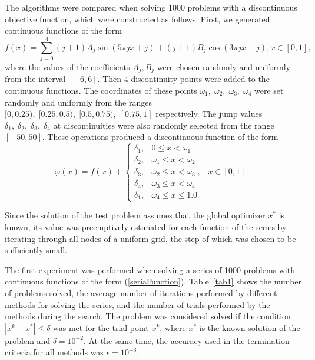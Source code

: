 \documentclass[runningheads]{llncs}
\begin{document}
The algorithms were compared when solving 1000 problems with a discontinuous objective function, which were constructed as follows. First, we generated continuous functions of the form
\begin{equation}\label{seriaFunction}
f(x) =  \sum_{j=0}^4{(j+1)A_j\sin{(5\pi jx+j)}+(j+1)B_j\cos(3\pi jx+j)}, x\in[0,1],
\end{equation}
where the values of the coefficients $A_j, B_j$ were chosen randomly and uniformly from the interval $[-6,6]$. Then 4 discontinuity points were added to the continuous functions. The coordinates of these points $\omega_1, \; \omega_2, \; \omega_3, \; \omega_4$ were set randomly and uniformly from the ranges $[0,0.25), \; [0.25,0.5), \; [0.5,0.75), \; [0.75,1]$ respectively. The jump values $\delta_1, \; \delta_2, \; \delta_3, \; \delta_4$ at discontinuities were also randomly selected from the range $[-50,50]$. These operations produced a discontinuous function of the form
\begin{equation}\label{seriaFunction_jump}
\varphi(x) =  f(x)+
\begin{cases}
	\delta_1, &0 \leq x < \omega_1\\
	\delta_2, &\omega_1 \leq x < \omega_2\\
	\delta_3, &\omega_2 \leq x < \omega_3 \;, \;\;\; x\in[0,1].\\
	\delta_4, &\omega_3 \leq x < \omega_4\\
	\delta_1, &\omega_4 \leq x \leq 1.0
\end{cases}
\end{equation}

Since the solution of the test problem assumes that the global optimizer $x^*$ is known, its value was preemptively estimated for each function of the series by iterating through all nodes of a uniform grid, the step of which was chosen to be sufficiently small.

The first experiment was performed when solving a series of 1000 problems with continuous functions of the form (\ref{seriaFunction}). Table~\ref{tab1} shows the number of problems solved, the average number of iterations performed by different methods for solving the series, and the number of trials performed by the methods during the search. The problem was considered solved if the condition $|x^k-x^* | \leq \delta$ was met for the trial point $x^k$, where $x^*$ is the known solution of the problem and $\delta= 10^{-2}$. At the same time, the accuracy used in the termination criteria for all methods was $\epsilon = 10^{-3}$.
\end{document}
